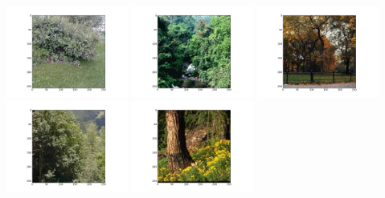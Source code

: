 \documentclass{report}
\begin{document}
\noindent
\includegraphics[width=4cm]{dbshow-2-0.png} 
\includegraphics[width=4cm]{dbshow-2-1.png} 
\includegraphics[width=4cm]{dbshow-2-2.png} 
\includegraphics[width=4cm]{dbshow-2-3.png} 
\includegraphics[width=4cm]{dbshow-2-4.png} 
\end{document}
